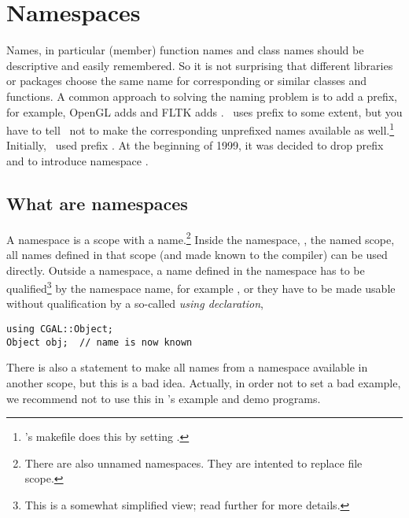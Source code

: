
\chapter{Namespaces}
\label{chap:namespaces}

Names, in particular (member) function names and class names should 
be descriptive and easily remembered. So it is not surprising that
different libraries or packages choose the same name for corresponding
or similar classes and functions. A common approach to solving the
naming problem is to add a prefix, for example, 
OpenGL adds 
and FLTK adds . \leda\ uses prefix %
to some extent, 
but you have to tell \leda\ not to make the corresponding unprefixed names 
available as well.\footnote{\cgal's
makefile does this by setting .} Initially, \cgal\ used
prefix . 
At the beginning of 1999, it was decided to drop prefix  and to 
introduce namespace . 

\section{What are namespaces}
A namespace
is a scope with a name.\footnote{There are also unnamed namespaces.
They are intented to replace file scope.} Inside the namespace, \ie, the
named scope, all names defined in that scope (and made known to the compiler) 
can be used directly. Outside a namespace, a name defined in the namespace
has to be qualified\footnote{This is a somewhat simplified view; read further
for more details.} by the namespace name, for example ,%
or they have to be made usable without qualification by a so-called 
{\em using declaration},
\begin{verbatim}
using CGAL::Object;
Object obj;  // name is now known
\end{verbatim}
There is also a statement to make all names from a namespace available in
another scope, but this is a bad idea. Actually, in order not to set a bad
example, we recommend not to use this in \cgal's example and demo programs.

